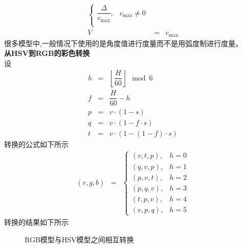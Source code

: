 \documentclass[UTF8,a4paper,10pt]{ctexart}
\begin{document}
\begin{flushleft}
\begin{eqnarray}
\begin{cases}
                \dfrac{\Delta}{c_{\max}},&c_{\max}\neq{0}\\
            \end{cases}\nonumber\\
            V&=&c_{\max}\nonumber
        \end{eqnarray}
        很多模型中,一般情况下使用的是角度值进行度量而不是用弧度制进行度量。\\
        \heiti\textbf{从HSV到RGB的彩色转换}\songti\\
        \hspace{2em}设
        \begin{eqnarray}
            h&=&\left\lfloor\dfrac{H}{60}\right\rfloor\mod{6}\nonumber\\
            f&=&\dfrac{H}{60}-h\nonumber\\
            p&=&v\cdot(1-s)\nonumber\\
            q&=&v\cdot{(1-f\cdot{s})}\nonumber\\
            t&=&v\cdot(1-(1-f)\cdot{s})\nonumber
        \end{eqnarray}
        转换的公式如下所示
        \begin{eqnarray}
            (r,g,b)&=&\begin{cases}
                (v,t,p),&h=0\\
                (q,v,p),&h=1\\
                (p,v,t),&h=2\\
                (p,q,v),&h=3\\
                (t,p,v),&h=4\\
                (v,p,q),&h=5
            \end{cases}\nonumber
        \end{eqnarray}
        转换的结果如下所示
        \begin{figure}[htbp]
            \centering
            \caption{RGB模型与HSV模型之间相互转换}
            \label{fig:fig_rgb_hsv_model}
        \end{figure}

\end{flushleft}
\end{document}
